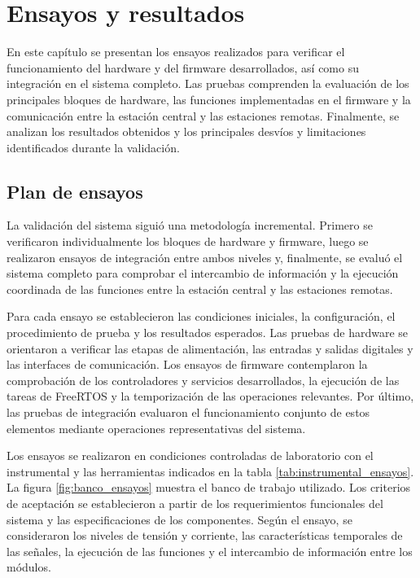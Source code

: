 \chapter{Ensayos y resultados}
\label{Chapter4}

En este capítulo se presentan los ensayos realizados para verificar el funcionamiento del hardware y del firmware desarrollados, así como su integración en el sistema completo. Las pruebas comprenden la evaluación de los principales bloques de hardware, las funciones implementadas en el firmware y la comunicación entre la estación central y las estaciones remotas. Finalmente, se analizan los resultados obtenidos y los principales desvíos y limitaciones identificados durante la validación.

\section{Plan de ensayos}

La validación del sistema siguió una metodología incremental. Primero se verificaron individualmente los bloques de hardware y firmware, luego se realizaron ensayos de integración entre ambos niveles y, finalmente, se evaluó el sistema completo para comprobar el intercambio de información y la ejecución coordinada de las funciones entre la estación central y las estaciones remotas.

Para cada ensayo se establecieron las condiciones iniciales, la configuración, el procedimiento de prueba y los resultados esperados. Las pruebas de hardware se orientaron a verificar las etapas de alimentación, las entradas y salidas digitales y las interfaces de comunicación. Los ensayos de firmware contemplaron la comprobación de los controladores y servicios desarrollados, la ejecución de las tareas de FreeRTOS y la temporización de las operaciones relevantes. Por último, las pruebas de integración evaluaron el funcionamiento conjunto de estos elementos mediante operaciones representativas del sistema.

Los ensayos se realizaron en condiciones controladas de laboratorio con el instrumental y las herramientas indicados en la tabla \ref{tab:instrumental_ensayos}. La figura \ref{fig:banco_ensayos} muestra el banco de trabajo utilizado. Los criterios de aceptación se establecieron a partir de los requerimientos funcionales del sistema y las especificaciones de los componentes. Según el ensayo, se consideraron los niveles de tensión y corriente, las características temporales de las señales, la ejecución de las funciones y el intercambio de información entre los módulos.

